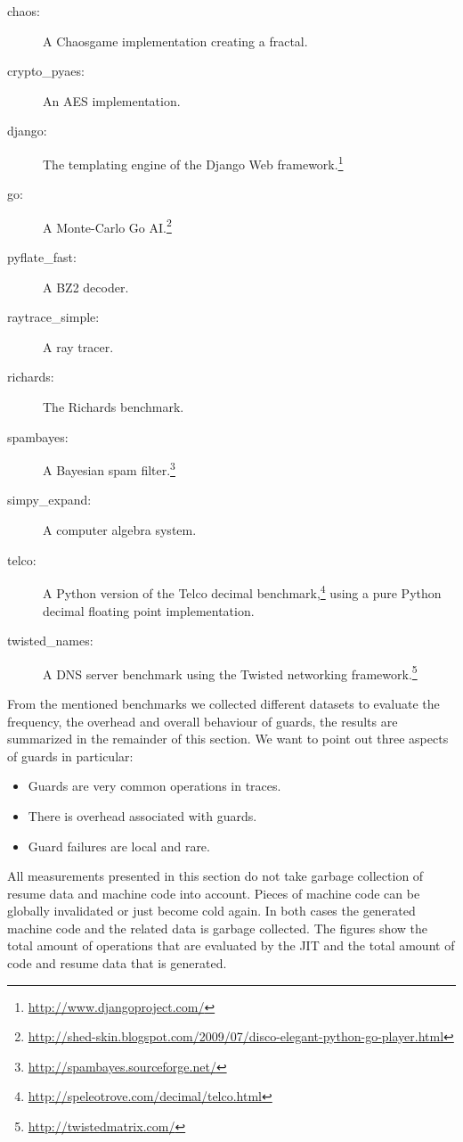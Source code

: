 \documentclass[10pt,preprint]{sigplanconf}
\begin{document}
\begin{description}
    \item[chaos:] A Chaosgame implementation creating a fractal.
    \item[crypto\_pyaes:] An AES implementation.
    \item[django:] The templating engine of the Django Web
        framework.\footnote{\url{http://www.djangoproject.com/}}

    \item[go:] A Monte-Carlo Go
        AI.\footnote{\url{http://shed-skin.blogspot.com/2009/07/disco-elegant-python-go-player.html}}
    \item[pyflate\_fast:] A BZ2 decoder.
    \item[raytrace\_simple:] A ray tracer.
    \item[richards:] The Richards benchmark.
    \item[spambayes:] A Bayesian spam filter.\footnote{\url{http://spambayes.sourceforge.net/}}
    \item[simpy\_expand:] A computer algebra system.
    \item[telco:] A Python version of the Telco decimal
        benchmark,\footnote{\url{http://speleotrove.com/decimal/telco.html}}
        using a pure Python decimal floating point implementation.
    \item[twisted\_names:] A DNS server benchmark using the Twisted networking
        framework.\footnote{\url{http://twistedmatrix.com/}}
\end{description}

From the mentioned benchmarks we collected different datasets to evaluate the
frequency, the overhead and overall behaviour of guards, the results are
summarized in the remainder of this section. We want to point out three
aspects of guards in particular:
\begin{itemize}
  \item Guards are very common operations in traces.
  \item There is overhead associated with guards.
  \item Guard failures are local and rare.
\end{itemize}

All measurements presented in this section do not take garbage collection of resume data and machine code into account. Pieces
of machine code can be globally invalidated or just become cold again. In both
cases the generated machine code and the related data is garbage collected. The
figures show the total amount of operations that are evaluated by the JIT and
the total amount of code and resume data that is generated.
\end{document}
